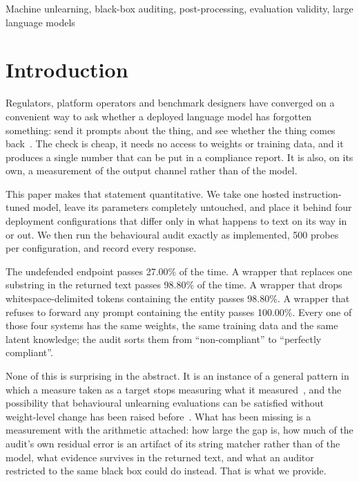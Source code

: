 \documentclass[journal]{IEEEtran}
\theoremstyle{definition}
\newcommand{\Nper}{500}
\newcommand{\NoneRate}{27.00}
\newcommand{\PfRate}{100.00}
\newcommand{\OfRate}{98.80}
\newcommand{\SenRate}{98.80}
\begin{document}
\begin{IEEEkeywords}
Machine unlearning, black-box auditing, post-processing, evaluation validity, large language models
\end{IEEEkeywords}

\section{Introduction}

Regulators, platform operators and benchmark designers have converged on a
convenient way to ask whether a deployed language model has forgotten something:
send it prompts about the thing, and see whether the thing comes
back~\cite{maini2024tofu,shi2024muse,li2024wmdp}. The check is cheap, it needs no
access to weights or training data, and it produces a single number that can be
put in a compliance report. It is also, on its own, a measurement of the output
channel rather than of the model.

This paper makes that statement quantitative. We take one hosted
instruction-tuned model, leave its parameters completely untouched, and place it
behind four deployment configurations that differ only in what happens to text on
its way in or out. We then run the behavioural audit exactly as implemented,
\Nper{} probes per configuration, and record every response.

The undefended endpoint passes \NoneRate\% of the time. A wrapper that replaces
one substring in the returned text passes \OfRate\% of the time. A wrapper that
drops whitespace-delimited tokens containing the entity passes \SenRate\%. A
wrapper that refuses to forward any prompt containing the entity passes
\PfRate\%. Every one of those four systems has the same weights, the same
training data and the same latent knowledge; the audit sorts them from
``non-compliant'' to ``perfectly compliant''.

None of this is surprising in the abstract. It is an instance of a general
pattern in which a measure taken as a target stops measuring what it
measured~\cite{strathern1997improving,manheim2018categorizing}, and the
possibility that behavioural unlearning evaluations can be satisfied without
weight-level change has been raised
before~\cite{thudi2022necessity,lynch2024eight,hayes2024inexact,lucki2024adversarial}.
What has been missing is a measurement with the arithmetic attached: how large
the gap is, how much of the audit's own residual error is an artifact of its
string matcher rather than of the model, what evidence survives in the returned
text, and what an auditor restricted to the same black box could do instead. That
is what we provide.
\end{document}
